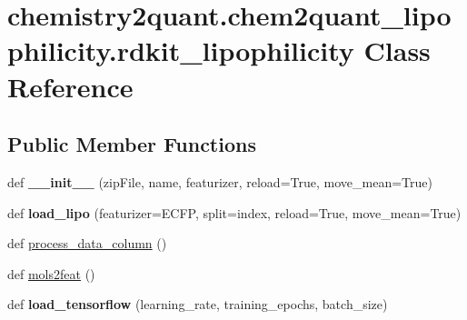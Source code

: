\hypertarget{classchemistry2quant_1_1chem2quant__lipophilicity_1_1rdkit__lipophilicity}{}\section{chemistry2quant.\+chem2quant\+\_\+lipophilicity.\+rdkit\+\_\+lipophilicity Class Reference}
\label{classchemistry2quant_1_1chem2quant__lipophilicity_1_1rdkit__lipophilicity}
\subsection*{Public Member Functions}
\begin{DoxyCompactItemize}
\item 
\mbox{\label{classchemistry2quant_1_1chem2quant__lipophilicity_1_1rdkit__lipophilicity_af5b6fb3d40a8cce2f1b344812db04725}} 
def {\bfseries \+\_\+\+\_\+init\+\_\+\+\_\+} (zip\+File, name, featurizer, reload=True, move\+\_\+mean=True)
\item 
\mbox{\label{classchemistry2quant_1_1chem2quant__lipophilicity_1_1rdkit__lipophilicity_aaea0b378e8a9497dbb78a3c4c57150b6}} 
def {\bfseries load\+\_\+lipo} (featurizer=\textquotesingle{}E\+C\+FP\textquotesingle{}, split=\textquotesingle{}index\textquotesingle{}, reload=True, move\+\_\+mean=True)
\item 
def \hyperlink{classchemistry2quant_1_1chem2quant__lipophilicity_1_1rdkit__lipophilicity_a46c111c55d4619ab2865950b46d6c361}{process\+\_\+data\+\_\+column} ()
\item 
def \hyperlink{classchemistry2quant_1_1chem2quant__lipophilicity_1_1rdkit__lipophilicity_a0529318f2021adfc7004f786ac98848d}{mols2feat} ()
\item 
\mbox{\label{classchemistry2quant_1_1chem2quant__lipophilicity_1_1rdkit__lipophilicity_a36ee971cb0428619d675d1482e077d08}} 
def {\bfseries load\+\_\+tensorflow} (learning\+\_\+rate, training\+\_\+epochs, batch\+\_\+size)
\item 
\mbox{\label{classchemistry2quant_1_1chem2quant__lipophilicity_1_1rdkit__lipophilicity_a50246b2da424307fce4c177cb02da8e0}} 

\end{DoxyCompactItemize}
